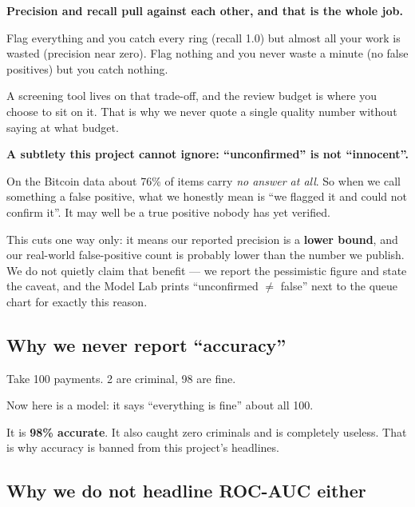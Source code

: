 \documentclass[11pt,a4paper]{article}
\begin{document}
\begin{keybox}
\textbf{Precision and recall pull against each other, and that is the whole
job.}

Flag everything and you catch every ring (recall 1.0) but almost all your work
is wasted (precision near zero). Flag nothing and you never waste a minute
(no false positives) but you catch nothing.

A screening tool lives on that trade-off, and the review budget is where you
choose to sit on it. That is why we never quote a single quality number without
saying at what budget.
\end{keybox}

\begin{warnbox}
\textbf{A subtlety this project cannot ignore: ``unconfirmed'' is not
``innocent''.}

On the Bitcoin data about 76\% of items carry \emph{no answer at all}. So when
we call something a false positive, what we honestly mean is ``we flagged it and
could not confirm it''. It may well be a true positive nobody has yet verified.

This cuts one way only: it means our reported precision is a
\textbf{lower bound}, and our real-world false-positive count is probably lower
than the number we publish. We do not quietly claim that benefit --- we report
the pessimistic figure and state the caveat, and the Model Lab prints
``unconfirmed $\neq$ false'' next to the queue chart for exactly this reason.
\end{warnbox}

\subsection{Why we never report ``accuracy''}

\begin{plain}
Take 100 payments. 2 are criminal, 98 are fine.

Now here is a model: it says ``everything is fine'' about all 100.

It is \textbf{98\% accurate}. It also caught zero criminals and is completely
useless. That is why accuracy is banned from this project's headlines.
\end{plain}

\subsection{Why we do not headline ROC-AUC either}
\end{document}
